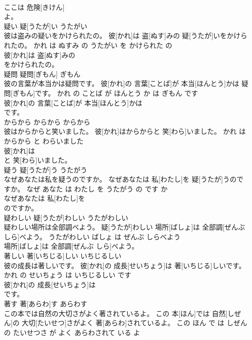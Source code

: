 \documentclass[8pt]{extreport}
\begin{document}
\begin{CJK}{UTF8}{min}
\\	ここは 危険[きけん]
\\	よ。			
\\	疑い	疑[うたが]い	うたがい	
\\	彼は盗みの疑いをかけられたの。	彼[かれ]は 盗[ぬす]みの 疑[うたが]いをかけられたの。	かれ は ぬすみ の うたがい を かけられた の	
\\	彼[かれ]は 盗[ぬす]みの
\\	をかけられたの。			
\\	疑問	疑問[ぎもん]	ぎもん	
\\	彼の言葉が本当かは疑問です。	彼[かれ]の 言葉[ことば]が 本当[ほんとう]かは 疑問[ぎもん]です。	かれ の ことば が ほんとう か は ぎもん です	
\\	彼[かれ]の 言葉[ことば]が 本当[ほんとう]かは
\\	です。			
\\	からから	からから	からから	
\\	彼はからからと笑いました。	彼[かれ]はからからと 笑[わら]いました。	かれ は からから と わらいました	
\\	彼[かれ]は
\\	と 笑[わら]いました。			
\\	疑う	疑[うたが]う	うたがう	
\\	なぜあなたは私を疑うのですか。	なぜあなたは 私[わたし]を 疑[うたが]うのですか。	なぜ あなた は わたし を うたがう の です か	
\\	なぜあなたは 私[わたし]を
\\	のですか。			
\\	疑わしい	疑[うたが]わしい	うたがわしい	
\\	疑わしい場所は全部調べよう。	疑[うたが]わしい 場所[ばしょ]は 全部調[ぜんぶ しら]べよう。	うたがわしい ばしょ は ぜんぶ しらべよう	
\\	場所[ばしょ]は 全部調[ぜんぶ しら]べよう。			
\\	著しい	著[いちじる]しい	いちじるしい	
\\	彼の成長は著しいです。	彼[かれ]の 成長[せいちょう]は 著[いちじる]しいです。	かれ の せいちょう は いちじるしい です	
\\	彼[かれ]の 成長[せいちょう]は
\\	です。			
\\	著す	著[あらわ]す	あらわす	
\\	この本では自然の大切さがよく著されているよ。	この 本[ほん]では 自然[しぜん]の 大切[たいせつ]さがよく 著[あらわ]されているよ。	この ほん で は しぜん の たいせつさ が よく あらわされて いる よ	

\end{CJK}
\end{document}
